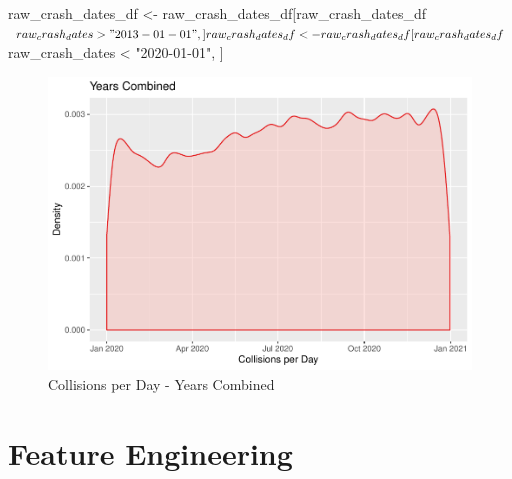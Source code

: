 \begin{Schunk}
\begin{Sinput}
raw_crash_dates_df <- raw_crash_dates_df[raw_crash_dates_df$raw_crash_dates > "2013-01-01", ]
raw_crash_dates_df <- raw_crash_dates_df[raw_crash_dates_df$raw_crash_dates < "2020-01-01", ]
\end{Sinput}
\end{Schunk}

\begin{Schunk}
\begin{figure}

{\centering \includegraphics{RMarkdown-Group_10-Assignment_1_files/figure-latex/unnamed-chunk-6-1} 

}

\caption[Collisions per Day - Years Combined]{Collisions per Day - Years Combined}\label{fig:unnamed-chunk-6}
\end{figure}
\end{Schunk}

\hypertarget{feature-engineering}{%
\section{Feature Engineering}\label{feature-engineering}}

